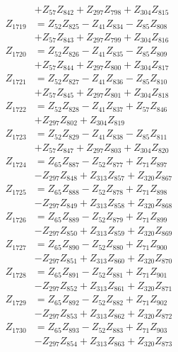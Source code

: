 \begin{multicols}{2}
\begin{align}
&+ Z_{57}Z_{842} + Z_{297}Z_{798} + Z_{304}Z_{815} \nonumber \\
Z_{1719} &= Z_{52}Z_{825} - Z_{41}Z_{834} - Z_{85}Z_{808}  \nonumber \\
&+ Z_{57}Z_{843} + Z_{297}Z_{799} + Z_{304}Z_{816} \nonumber \\
Z_{1720} &= Z_{52}Z_{826} - Z_{41}Z_{835} - Z_{85}Z_{809}  \nonumber \\
&+ Z_{57}Z_{844} + Z_{297}Z_{800} + Z_{304}Z_{817} \nonumber \\
Z_{1721} &= Z_{52}Z_{827} - Z_{41}Z_{836} - Z_{85}Z_{810}  \nonumber \\
&+ Z_{57}Z_{845} + Z_{297}Z_{801} + Z_{304}Z_{818} \nonumber \\
Z_{1722} &= Z_{52}Z_{828} - Z_{41}Z_{837} + Z_{57}Z_{846}  \nonumber \\
&+ Z_{297}Z_{802} + Z_{304}Z_{819} \nonumber \\
Z_{1723} &= Z_{52}Z_{829} - Z_{41}Z_{838} - Z_{85}Z_{811}  \nonumber \\
&+ Z_{57}Z_{847} + Z_{297}Z_{803} + Z_{304}Z_{820} \nonumber \\
Z_{1724} &= Z_{65}Z_{887} - Z_{52}Z_{877} + Z_{71}Z_{897}  \nonumber \\
&- Z_{297}Z_{848} + Z_{313}Z_{857} + Z_{320}Z_{867} \nonumber \\
Z_{1725} &= Z_{65}Z_{888} - Z_{52}Z_{878} + Z_{71}Z_{898}  \nonumber \\
&- Z_{297}Z_{849} + Z_{313}Z_{858} + Z_{320}Z_{868} \nonumber \\
Z_{1726} &= Z_{65}Z_{889} - Z_{52}Z_{879} + Z_{71}Z_{899}  \nonumber \\
&- Z_{297}Z_{850} + Z_{313}Z_{859} + Z_{320}Z_{869} \nonumber \\
Z_{1727} &= Z_{65}Z_{890} - Z_{52}Z_{880} + Z_{71}Z_{900}  \nonumber \\
&- Z_{297}Z_{851} + Z_{313}Z_{860} + Z_{320}Z_{870} \nonumber \\
Z_{1728} &= Z_{65}Z_{891} - Z_{52}Z_{881} + Z_{71}Z_{901}  \nonumber \\
&- Z_{297}Z_{852} + Z_{313}Z_{861} + Z_{320}Z_{871} \nonumber \\
Z_{1729} &= Z_{65}Z_{892} - Z_{52}Z_{882} + Z_{71}Z_{902}  \nonumber \\
&- Z_{297}Z_{853} + Z_{313}Z_{862} + Z_{320}Z_{872} \nonumber \\
Z_{1730} &= Z_{65}Z_{893} - Z_{52}Z_{883} + Z_{71}Z_{903}  \nonumber \\
&- Z_{297}Z_{854} + Z_{313}Z_{863} + Z_{320}Z_{873} \nonumber \\

\end{align}
\end{multicols}
